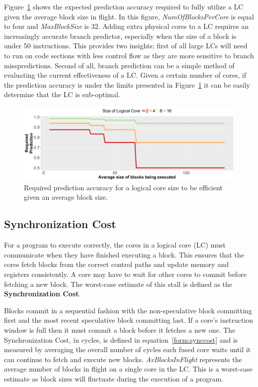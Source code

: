 Figure~\ref{fig:req_pred} shows the expected prediction accuracy required to fully utilize a LC given the average block size in flight.
In this figure, \textit{NumOfBlocksPerCore} is equal to four and \textit{MaxBlockSize} is 32.
Adding extra physical cores to a LC requires an increasingly accurate branch predictor, especially when the size of a block is under 50 instructions.
This provides two insights; first of all large LCs will need to run on code sections with less control flow as they are more sensitive to branch misspredictions.
Second of all, branch prediction can be a simple method of evaluating the current effectiveness of a LC.
Given a certain number of cores, if the prediction accuracy is under the limits presented in Figure~\ref{fig:req_pred} it can be easily determine that the LC is sub-optimal.

\begin{figure}[t]
    \centering
    \includegraphics[width=\textwidth]{cases-paper/graphics/limit_study/prediction_req.pdf}
    \caption{Required prediction accuracy for a logical core size to be efficient given an average block size.}
    \label{fig:req_pred}
	\vspace{1em}
\end{figure}
\subsection{Synchronization Cost}

For a program to execute correctly, the cores in a logical core (LC) must communicate when they have finished executing a block.
This ensures that the cores fetch blocks from the correct control paths and update memory and registers consistently.
A core may have to wait for other cores to commit before fetching a new block. 
The worst-case estimate of this stall is defined as the \textbf{Synchronization Cost}.

Blocks commit in a sequential fashion with the non-speculative block committing first and the most recent speculative block committing last.
If a core's instruction window is full then it must commit a block before it fetches a new one.
The Synchronization Cost, in cycles, is defined in equation~\ref{form:synccost} and is measured by averaging the overall number of cycles each fused core waits until it can continue to fetch and execute new blocks.
\textit{AvBlocksInFlight} represents the average number of blocks in flight on a single core in the LC.
This is a worst-case estimate as block sizes will fluctuate during the execution of a program.

